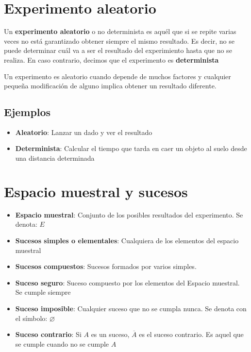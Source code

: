 \section{Experimento aleatorio}

Un \textbf{experimento aleatorio} o no determinista es aquél que si se repite varias veces no está garantizado obtener siempre el mismo resultado. Es decir, no se puede determinar cuál va a ser el resultado del experimiento hasta que no se realiza. En caso contrario, decimos que el experimento es \textbf{determinista}

Un experimento es aleatorio cuando depende de muchos factores y cualquier pequeña modificación de alguno implica obtener un resultado diferente.

\subsection{Ejemplos}

\begin{itemize}
 \item \textbf{Aleatorio}: Lanzar un dado y ver el resultado
 \item \textbf{Determinista}: Calcular el tiempo que tarda en caer un objeto al suelo desde una distancia determinada
 \end{itemize} 
 
\section{Espacio muestral y sucesos}
\begin{itemize}
\item \textbf{Espacio muestral}: Conjunto de los posibles resultados del experimento. Se denota: $E$
\item \textbf{Sucesos simples o elementales}: Cualquiera de los elementos del espacio muestral
\item \textbf{Sucesos compuestos}: Sucesos formados por varios simples. 
\item \textbf{Suceso seguro}: Suceso compuesto por los elementos del Espacio muestral. Se cumple siempre
\item \textbf{Suceso imposible}: Cualquier suceso que no se cumpla nunca. Se denota con el símbolo: $\varnothing$
\item \textbf{Suceso contrario}: Si $A$ es un suceso, $\overline{A}$ es el suceso contrario. Es aquel que se cumple cuando no se cumple $A$
\end{itemize}

